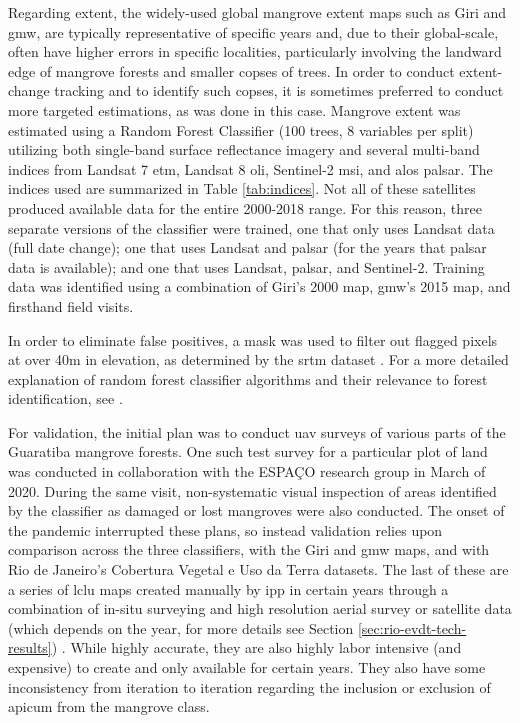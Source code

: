 Regarding extent, the widely-used global mangrove extent maps such as Giri and \ac{gmw}, are typically representative of specific years and, due to their global-scale, often have higher errors in specific localities, particularly involving the landward edge of mangrove forests and smaller copses of trees. In order to conduct extent-change tracking and to identify such copses, it is sometimes preferred to conduct more targeted estimations, as was done in this case. Mangrove extent was estimated using a Random Forest Classifier (100 trees, 8 variables per split) utilizing both single-band surface reflectance imagery and several multi-band indices from Landsat 7 \ac{etm}, Landsat 8 \ac{oli}, Sentinel-2 \ac{msi}, and \ac{alos} \ac{palsar}. The indices used are summarized in Table \ref{tab:indices}. Not all of these satellites produced available data for the entire 2000-2018 range. For this reason, three separate versions of the classifier were trained, one that only uses Landsat data (full date change); one that uses Landsat and \ac{palsar} (for the years that \ac{palsar} data is available); and one that uses Landsat, \ac{palsar}, and Sentinel-2. Training data was identified using a combination of Giri's 2000 map, \ac{gmw}'s 2015 map, and firsthand field visits. 

In order to eliminate false positives, a mask was used to filter out flagged pixels at over 40m in elevation, as determined by the \ac{srtm} dataset \cite{jarvisHolefilledSRTMGlobe2008}. For a more detailed explanation of random forest classifier algorithms and their relevance to forest identification, see \cite{jhonnerieRandomForestClassification2015}.

For validation, the initial plan was to conduct \ac{uav} surveys of various parts of the Guaratiba mangrove forests. One such test survey for a particular plot of land was conducted in collaboration with the ESPAÇO research group in March of 2020. During the same visit, non-systematic visual inspection of areas identified by the classifier as damaged or lost mangroves were also conducted. The onset of the pandemic interrupted these plans, so instead validation relies upon comparison across the three classifiers, with the Giri and \ac{gmw} maps, and with Rio de Janeiro's Cobertura Vegetal e Uso da Terra datasets. The last of these are a series of \ac{lclu} maps created manually by \ac{ipp} in certain years through a combination of in-situ surveying and high resolution aerial survey or satellite data (which depends on the year, for more details see Section \ref{sec:rio-evdt-tech-results}) \cite{institutopereirapassosCoberturaVegetalUso2021}. While highly accurate, they are also highly labor intensive (and expensive) to create and only available for certain years. They also have some inconsistency from iteration to iteration regarding the inclusion or exclusion of apicum from the mangrove class.

